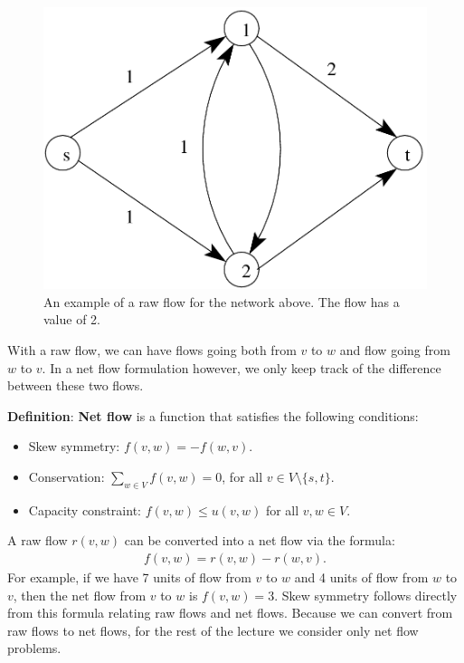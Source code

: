 \documentclass{article}
\begin{document}
\begin{figure}[h]
\begin{center}
  \includegraphics{ex_rawflow.png}
  \caption{An example of a raw flow for the network above. The flow has
  a value of 2.}
\label{fig:ex_rawflow}
\end{center}
\end{figure}


With a raw flow, we can have flows going both from $v$ to $w$ and flow
going from $w$ to $v$.  In a net flow formulation however, we only
keep track of the difference between these two flows.


\textbf{Definition}:
\textbf{Net flow} is a function that satisfies the following conditions:
\begin{itemize}
\item
  Skew symmetry: $f(v,w)=-f(w,v)$.
\item
  Conservation: $\sum_{w\in V} f(v,w)=0$, for all $v\in
  V\setminus\{s,t\}$.
\item
  Capacity constraint: $f(v,w)\le u(v,w)$ for all $v,w\in V$.
\end{itemize}

A raw flow $r(v, w)$ can be converted into a net flow via the formula:
\begin{align*}
  f(v, w) = r(v, w) - r(w, v).
\end{align*}
For example, if we have 7 units 
of flow from $v$ to $w$ and 4 units of flow from $w$ to $v$, then the
net flow from $v$ to $w$ is  $f(v, w) = 3$.  Skew symmetry follows
directly from this formula relating raw flows and net flows.  Because
we can convert from raw flows to net flows, for the rest of the
lecture we consider only net flow problems.
\end{document}

